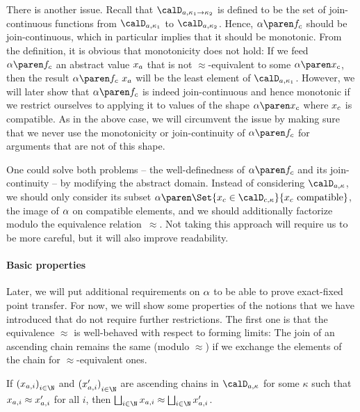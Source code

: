 \documentclass[../../diss.tex]{subfiles}
\begin{document}
There is another issue.
Recall that $\domaina{\kappa_1 \to \kappa_2}$ is defined to be the set of join-continuous functions from $\domaina{\kappa_1}$ to $\domaina{\kappa_2}$.
Hence, $\abs{\fc}$ should be join-continuous, which in particular implies that it should be monotonic.
From the definition, it is obvious that monotonicity does not hold:
If we feed $\abs{\fc}$ an abstract value $x_a$ that is not $\approx$-equivalent to some $\abs{\xc}$, then the result $\abs{\fc} \appl \xa$ will be the least element of $\domaina{\kappa_1}$.
However, we will later show that $\abs{\fc}$ is indeed join-continuous and hence monotonic if we restrict ourselves to applying it to values of the shape $\abs{\xc}$ where $x_c$ is compatible.
As in the above case, we will circumvent the issue by making sure that we never use the monotonicity or join-continuity of $\abs{\fc}$ for arguments that are not of this shape.

One could solve both problems -- the well-definedness of $\abs{\fc}$ and its join-continuity -- by modifying the abstract domain.
Instead of considering $\domaina{\kappa}$, we should only consider its subset $\abs{\Set{\xc \in \domainc{\kappa}}{\xc \text{ compatible}}}$, the image of $\abs$ on compatible elements, and we should additionally factorize modulo the equivalence relation~$\approx$.
Not taking this approach will require us to be more careful, but it will also improve readability.

\paragraph{Basic properties}

Later, we will put additional requirements on $\abs$ to be able to prove  exact-fixed point transfer.
For now, we will show some properties of the notions that we have introduced that do not require further restrictions.
The first one is that the equivalence $\approx$ is well-behaved with respect to forming limits:
The join of an ascending chain remains the same (modulo $\approx$) if we exchange the elements of the chain for $\approx$-equivalent ones.

\begin{lemma}%
\label{Lemma:HORSEFPTApproxLimits}%
    If ${(\xai)}_{i \in \N}$ and ${(\xai')}_{i \in \N}$ are ascending chains in $\domaina{\kappa}$ for some $\kappa$ such that $x_{a,i} \approx x_{a,i}'$ for all $i$, then $\bigsqcup_{i \in \N } \xai \approx \bigsqcup_{i \in \N} \xai'$.
\end{lemma}
\end{document}

